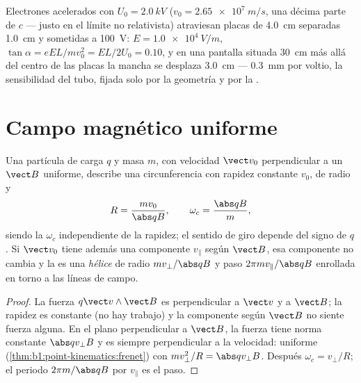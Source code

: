 \begin{example}\label{ex:b1:charged-particles:crt}
Electrones acelerados con $U_0 = \qty{2.0}{kV}$ ($v_0 = \qty{2.65e7}{m/s}$,
una décima parte de $c$ --- justo en el límite no relativista) atraviesan
placas de \qty{4.0}{cm} separadas \qty{1.0}{cm} y sometidas a \qty{100}{V}:
$E = \qty{1.0e4}{V/m}$, $\tan\alpha = eEL/mv_0^2 = EL/2U_0 = 0.10$, y en una
pantalla situada \qty{30}{cm} más allá del centro de las placas la mancha
se desplaza \qty{3.0}{cm} --- \qty{0.3}{mm} por voltio, la sensibilidad del
tubo, fijada solo por la geometría y por la .
\end{example}

\section{Campo magnético uniforme}

\begin{theorem}\label{thm:b1:charged-particles:bfield}
Una partícula de carga $q$ y masa $m$, con velocidad $\vect v_0$
perpendicular a un $\vect B$ uniforme, describe una circunferencia con
rapidez constante $v_0$, de radio y 
\[
R = \frac{mv_0}{\abs q B}, \qquad \omega_c = \frac{\abs q B}{m},
\]
siendo la \emph{} $\omega_c$ independiente de la
rapidez; el sentido de giro depende del signo de $q$. Si $\vect v_0$ tiene
además una componente $v_\parallel$ según $\vect B$, esa componente no
cambia y la  es una \emph{hélice} de radio $mv_\perp/\abs qB$ y
paso $2\pi mv_\parallel/\abs qB$ enrollada en torno a las líneas de campo.
\end{theorem}

\begin{proof}
La fuerza $q\vect v\wedge\vect B$ es perpendicular a $\vect v$ y a $\vect B$;
la rapidez es constante (no hay trabajo) y la componente según $\vect B$ no
siente fuerza alguna. En el plano perpendicular a $\vect B$, la fuerza
tiene norma constante $\abs qv_\perp B$ y es siempre perpendicular a la
velocidad:  uniforme
(\cref{thm:b1:point-kinematics:frenet}) con $mv_\perp^2/R =
\abs qv_\perp B$. Después $\omega_c = v_\perp/R$; el periodo $2\pi m/\abs qB$
por $v_\parallel$ es el paso.
\end{proof}

